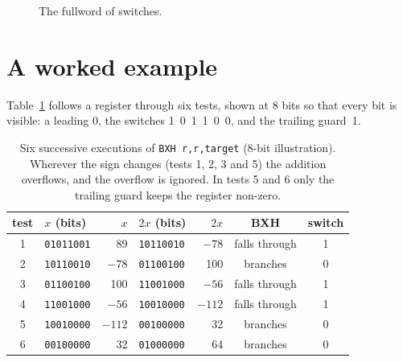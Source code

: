 \documentclass[11pt]{article}
\newcommand{\cell}[4]{%
  \node[draw, minimum width=7mm, minimum height=7mm, fill=#4,
        font=\ttfamily\small] at (#1,#2) {#3};}
\begin{document}
\begin{figure}[ht]
\centering
{}
\caption{The fullword of switches.}
\label{fig:layout}
\end{figure}

\section{A worked example}

Table~\ref{tab:walk} follows a register through six tests, shown at 8 bits
so that every bit is visible: a leading 0, the switches 1~0~1~1~0~0, and the
trailing guard~1.

\begin{table}[ht]
\centering
\begin{tabular}{clrlrcc}
\toprule
test & $x$ (bits) & $x$ & $2x$ (bits) & $2x$ & BXH & switch \\
\midrule
1 & \texttt{01011001} &   89 & \texttt{10110010} &  $-78$ & falls through & 1 \\
2 & \texttt{10110010} &  $-78$ & \texttt{01100100} &  100 & branches & 0 \\
3 & \texttt{01100100} &  100 & \texttt{11001000} &  $-56$ & falls through & 1 \\
4 & \texttt{11001000} &  $-56$ & \texttt{10010000} & $-112$ & falls through & 1 \\
5 & \texttt{10010000} & $-112$ & \texttt{00100000} &   32 & branches & 0 \\
6 & \texttt{00100000} &   32 & \texttt{01000000} &   64 & branches & 0 \\
\bottomrule
\end{tabular}
\caption{Six successive executions of \texttt{BXH r,r,target} (8-bit
illustration). Wherever the sign changes (tests 1, 2, 3 and 5) the addition
overflows, and the overflow is ignored. In tests 5 and 6 only the trailing
guard keeps the register non-zero.}
\label{tab:walk}
\end{table}
\end{document}
